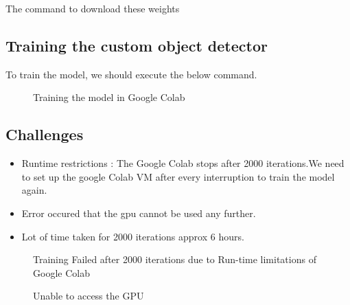 The command to download these weights \cite{Bochkovskiy:2020}


\subsection{Training the custom object detector}
To train the model, we should execute the below command.
\begin{figure}[H]
	\centering
	\caption{Training the model in Google Colab}
\end{figure}

\subsection{Challenges}

\begin{itemize}
	\item Runtime restrictions : The Google Colab stops after 2000 iterations.We need to set up the google Colab VM after every interruption to train the model again.
	\item Error occured that the \ac{gpu} cannot be used any further.
	\item Lot of time taken for 2000 iterations approx 6 hours.
\end{itemize}
\begin{figure}[H]
	\centering
	\caption{Training Failed after 2000 iterations due to Run-time limitations of Google Colab}
\end{figure}

\begin{figure}[H]
	\centering
	\caption{Unable to access the GPU} 
\end{figure}
